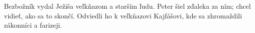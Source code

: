 Bezbožník vydal Ježiša veľkňazom a starším ľudu.
\versseparator
Peter šiel zďaleka za ním; chcel vidieť, ako sa to skončí.
\versseparator
Odviedli ho k veľkňazovi Kajfášovi, kde sa zhromaždili zákonníci a farizeji.
